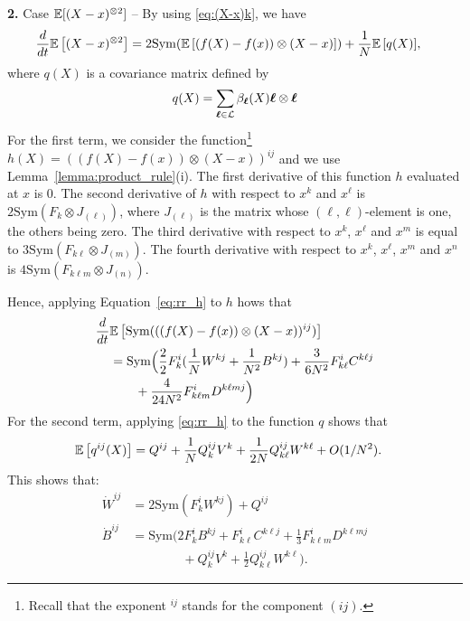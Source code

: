 \documentclass[sigconf]{acmart}
\newcommand\bl{{\text{\boldmath$\ell$}}}
\newcommand\calL{\mathcal{L}}
\newcommand\esp[1]{{\mathchoice{\besp{#1}}{\sesp{#1}}{\sesp{#1}}{\sesp{#1}}}}
\newcommand\besp[1]{\mathbb{E}\left[#1\right]}
\newcommand\sesp[1]{\mathbb{E}[#1]}
\newcommand\dt{\frac{d}{dt}}
\newcommand\Sym{\mathrm{Sym}}
\newcommand\J[1]{J_{(#1)}}
\begin{document}
  \textbf{2.} Case $\esp{(X-x)^{\otimes 2}}$ -- By using
  \eqref{eq:(X-x)k}, we have
  \begin{align*}
    \dt\esp{(X-x)^{\otimes2}} &=2\Sym(\esp{(f(X)-f(x))\otimes
                                (X-x)}) 
                              + \frac1N\esp{q(X)},
  \end{align*}
  where $q(X)$ is a covariance matrix defined by
  \begin{align*}
    q(X) = \sum_{\bl\in\calL} \beta_{\bl}(X)\bl\otimes\bl
  \end{align*}
  For the first term, we consider the function\footnote{Recall that
    the exponent ${}^{ij}$ stands for the component $(ij)$.}
  $h(X)=((f(X)-f(x))\otimes (X-x))^{ij}$ and we use
  Lemma~\ref{lemma:product_rule}(i). The first derivative of this
  function $h$ evaluated at $x$ is $0$. The second derivative of $h$
  with respect to $x^k$ and $x^\ell$ is $2\Sym(F_k\otimes \J{\ell})$,
  where $\J{\ell}$ is the matrix whose $(\ell,\ell)$-element is one,
  the others being zero. The third derivative with respect to $x^k$,
  $x^\ell$ and $x^m$ is equal to $3\Sym(F_{k\ell}\otimes \J{m})$. The
  fourth derivative with respect to $x^k$, $x^\ell$, $x^m$ and $x^n$
  is $4\Sym(F_{k\ell m}\otimes \J{n})$.

  Hence, applying Equation~\eqref{eq:rr_h} to $h$ hows that
  \begin{align*}
    \dt &\esp{\Sym(((f(X)-f(x))\otimes (X-x))^{ij})}\\
        &=\Sym\Big(\frac{2}{2}F^i_k (\frac1NW^{kj}+\frac1{N^2}B^{kj}) 
          + \frac{3}{6N^2} F^i_{k\ell} C^{k\ell j} \\
        &\qquad+ \frac{4}{24N^2} F^i_{k\ell m} D^{k\ell mj} \Big)
  \end{align*}
  For the second term, applying \eqref{eq:rr_h} to the function $q$
  shows that
  \begin{align*}
    \esp{q^{ij}(X)} &= Q^{ij} + \frac{1}{N} Q^{ij}_kV^k + \frac1{2N}
                          Q^{ij}_{k\ell}W^{k\ell} + O(1/N^2). 
  \end{align*}
  This shows that:
  \begin{align*}
    \dot{W}^{ij} &= 2\Sym(F^i_kW^{kj}) + Q^{ij}\\
    \dot{B}^{ij} &= \Sym\Big(2F^i_kB^{kj} + 
                    F^{i}_{k\ell}C^{k\ell j}
                    + \frac13F^i_{k\ell m}D^{k\ell mj} \\
                  &\qquad\qquad+ Q^{ij}_{k}V^{k} +
                    \frac12Q^{ij}_{k\ell}W^{k\ell}\Big). 
  \end{align*}
  
\end{document}
